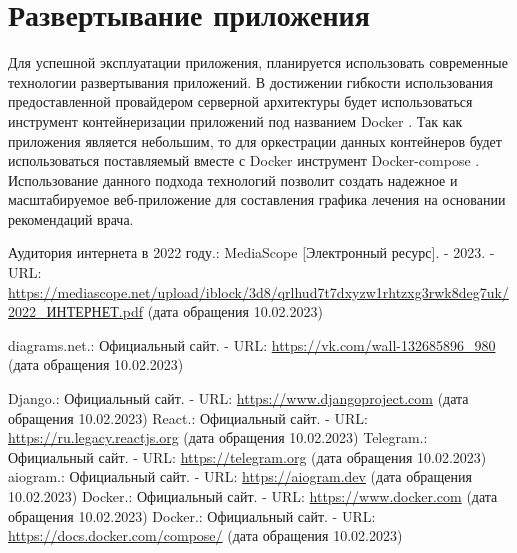 \documentclass[14pt]{extreport}
\begin{document}
    \section{Развертывание приложения}
        Для успешной эксплуатации приложения, планируется использовать современные технологии %
        развертывания приложений. В достижении гибкости использования предоставленной провайдером %
        серверной архитектуры будет использоваться инструмент контейнеризации приложений под названием %
        Docker \cite{docker}. Так как приложения является небольшим, то для оркестрации данных контейнеров будет использоваться %
        поставляемый вместе с Docker инструмент Docker-compose \cite{docker-compose}.
        Использование данного подхода технологий позволит создать надежное и %
        масштабируемое веб-приложение для составления графика лечения на %
        основании рекомендаций врача. 
        

% 
% 

\newpage
    \begin{thebibliography}{99}
         Аудитория интернета в 2022 году.: %
        MediaScope [Электронный ресурс]. - 2023. - URL: %
        \url{https://mediascope.net/upload/iblock/3d8/qrlhud7t7dxyzw1rhtzxg3rwk8deg7uk/2022_ИНТЕРНЕТ.pdf} %
        (дата обращения 10.02.2023)

         diagrams.net.: Официальный сайт. - %
        URL: \url{https://vk.com/wall-132685896_980} (дата обращения 10.02.2023)

         Django.: Официальный сайт. - %
        URL: \url{https://www.djangoproject.com} (дата обращения 10.02.2023) 
         React.: Официальный сайт. - %
        URL: \url{https://ru.legacy.reactjs.org} (дата обращения 10.02.2023) 
         Telegram.: Официальный сайт. - %
        URL: \url{https://telegram.org} (дата обращения 10.02.2023) 
         aiogram.: Официальный сайт. - %
        URL: \url{https://aiogram.dev} (дата обращения 10.02.2023) 
         Docker.: Официальный сайт. - %
        URL: \url{https://www.docker.com} (дата обращения 10.02.2023) 
         Docker.: Официальный сайт. - %
        URL: \url{https://docs.docker.com/compose/} (дата обращения 10.02.2023) 

    \end{thebibliography}
\end{document}
